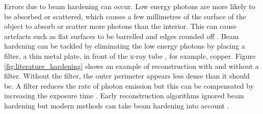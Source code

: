 Errors due to beam hardening can occur. Low energy photons are more likely to be absorbed or scattered, which causes a few millimetres of the surface of the object to absorb or scatter more photons than the interior. This can cause artefacts \citep{sun2016applications} such as flat surfaces to be barrelled and edges rounded off \citep{kruth2011computed}. Beam hardening can be tackled by eliminating the low energy photons by placing a filter, a thin metal plate, in front of the x-ray tube \citep{welkenhuyzen2009industrial}, for example, copper. Figure \ref{fig:literature_hardening} shows an example of reconstruction with and without a filter. Without the filter, the outer perimeter appears less dense than it should be.  A filter reduces the rate of photon emission but this can be compensated by increasing the exposure time \citep{kruth2011computed}. Early reconstruction algorithms ignored beam hardening but modern methods can take beam hardening into account \citep{elbakri2001statistical, sun2016applications}.

